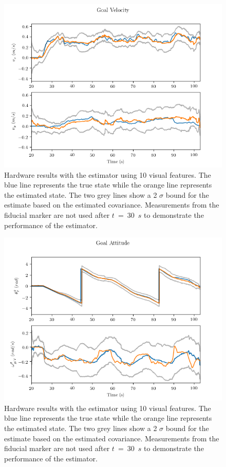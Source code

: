 \begin{figure}
  \centering
  \includegraphics[scale=0.5]{plots/hardware_gv.png}
  \caption{Hardware results with the estimator using 10 visual
  features. The blue line represents the true state while the orange line
  represents the estimated state. The two grey lines show a 2 $\sigma$ bound for
  the estimate based on the estimated covariance. Measurements from the fiducial
  marker are not used after $t$~=~30~$s$ to demonstrate the performance of the estimator.}
  \label{fig:hardware_gv}
\end{figure}

\begin{figure}
  \centering
  \includegraphics[scale=0.5]{plots/hardware_gatt.png}
  \caption{Hardware results with the estimator using 10 visual
  features. The blue line represents the true state while the orange line
  represents the estimated state. The two grey lines show a 2 $\sigma$ bound for
  the estimate based on the estimated covariance. Measurements from the fiducial
  marker are not used after $t$~=~30~$s$ to demonstrate the performance of the estimator.}
  \label{fig:hardware_gatt}
\end{figure}
